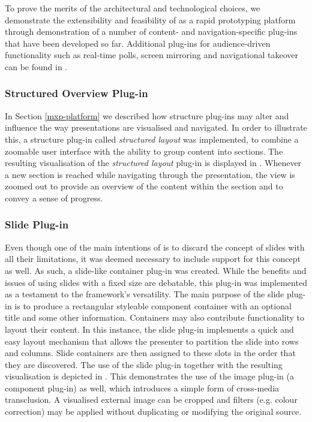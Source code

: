     To prove the merits of the architectural and technological choices, we
    demonstrate the extensibility and feasibility of \mxp as a rapid
    prototyping platform through demonstration of a number of content- and
    navigation-specific plug-ins that have been developed so far. Additional
    plug-ins for audience-driven functionality such as real-time polls, screen
    mirroring and navigational takeover can be found in \citep{roels-2}.

    \subsubsection{Structured Overview Plug-in}

     In Section \ref{mxp-platform} we described how structure plug-ins may
     alter and influence the way presentations are visualised and navigated. In
     order to illustrate this, a structure plug-in called \emph{structured
     layout} was implemented, to combine a zoomable user interface with the
     ability to group content into sections. The resulting visualisation of the
     \emph{structured layout} plug-in is displayed in .
     Whenever a new section is reached while navigating through the
     presentation, the view is zoomed out to provide an overview of the content
     within the section and to convey a sense of progress.

    \subsubsection{Slide Plug-in}

     Even though one of the main intentions of \mxp is to discard the concept
     of slides with all their limitations, it was deemed necessary to include
     support for this concept as well. As such, a slide-like container plug-in
     was created. While the benefits and issues of using slides with a fixed
     size are debatable, this plug-in was implemented as a testament to the
     framework's versatility. The main purpose of the slide plug-in is to
     produce a rectangular styleable component container with an optional title
     and some other information. Containers may also contribute functionality
     to layout their content. In this instance, the slide plug-in implements a
     quick and easy layout mechanism that allows the presenter to partition the
     slide into rows and columns. Slide containers are then assigned to these
     slots in the order that they are discovered. The use of the slide plug-in
     together with the resulting visualisation is depicted in
     . This demonstrates the use of the image plug-in (a
     component plug-in) as well, which introduces a simple form of cross-media
     transclusion. A visualised external image can be cropped and filters (e.g.
     colour correction) may be applied without duplicating or modifying the
     original source.

